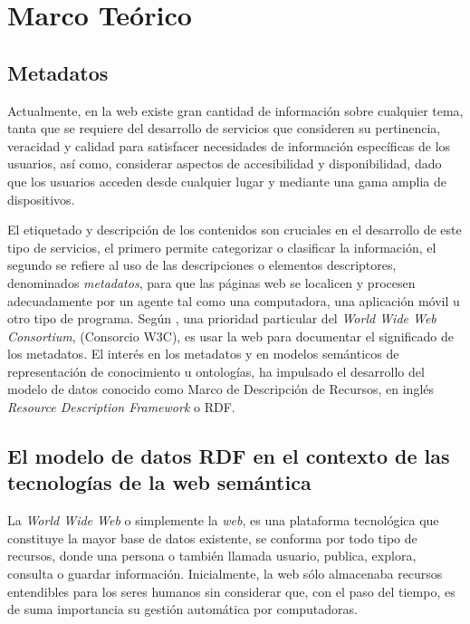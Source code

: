\renewcommand{\chaptername}{Capitulo}
\chapter{Marco Te\'orico} 
\section{Metadatos}

Actualmente, en la web existe gran cantidad de informaci\'on sobre cualquier tema, tanta que se requiere del desarrollo de servicios que consideren su pertinencia, veracidad y  calidad para satisfacer necesidades de informaci\'on espec\'ificas de los usuarios, as\'i como, considerar aspectos de accesibilidad y disponibilidad, dado que los usuarios acceden desde cualquier lugar y mediante una gama amplia de dispositivos.

El etiquetado y descripci\'on de los contenidos son cruciales en el desarrollo de este tipo de servicios, el primero permite categorizar o clasificar la informaci\'on, el segundo se refiere al uso de las descripciones o elementos descriptores, denominados \emph{metadatos}, para que las p\'aginas web se localicen y procesen adecuadamente por un agente tal como una computadora, una aplicaci\'on m\'ovil u otro tipo de programa. Seg\'un \cite{W3C}, una prioridad particular del \emph{World Wide Web Consortium}, (Consorcio W3C), es usar la web para documentar el significado de los metadatos. El inter\'es en los metadatos 
y en modelos sem\'anticos de representaci\'on de conocimiento u ontolog\'ias, ha impulsado el desarrollo del modelo de datos conocido como Marco de Descripci\'on de Recursos, en ingl\'es \emph{Resource Description Framework} o RDF. 

\section{El modelo de datos RDF en el contexto de las tecnolog\'ias de la web sem\'antica}

La \textit{World Wide Web} o simplemente la \textit{web}, es una plataforma tecnol\'ogica que constituye la mayor base de datos existente, se conforma por todo tipo de recursos, donde una persona o tambi\'en llamada usuario, publica, explora, consulta o guardar informaci\'on. Inicialmente, la web s\'olo almacenaba recursos entendibles para los seres humanos sin considerar que, con el paso del tiempo, es de suma importancia su gesti\'on autom\'atica por computadoras. 

